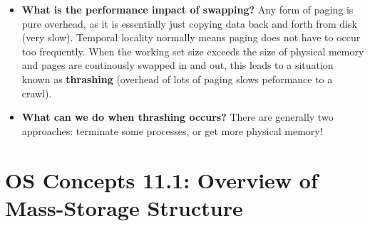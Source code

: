 \documentclass[12pt]{article}
\begin{document}
\begin{itemize}
    \item \textbf{What is the performance impact of swapping?} Any form of paging is pure overhead, as it is essentially just copying data back and forth from disk (very slow). Temporal locality normally means paging does not have to occur too frequently. When the working set size exceeds the size of physical memory and pages are continously swapped in and out, this leads to a situation known as \textbf{thrashing} (overhead of lots of paging slows peformance to a crawl).
    \item \textbf{What can we do when thrashing occurs?} There are generally two approaches: terminate some processes, or get more physical memory!
\end{itemize}

\section*{OS Concepts 11.1: Overview of Mass-Storage Structure}
\end{document}
